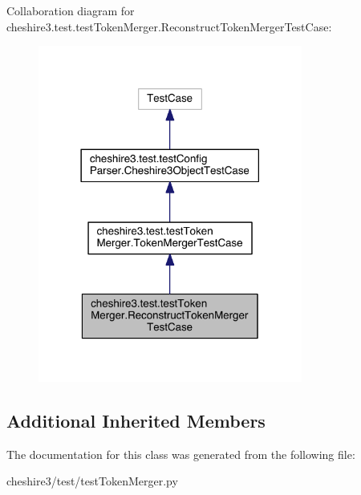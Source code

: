 Collaboration diagram for cheshire3.\-test.\-test\-Token\-Merger.\-Reconstruct\-Token\-Merger\-Test\-Case\-:
\nopagebreak
\begin{figure}[H]
\begin{center}
\leavevmode
\includegraphics[width=246pt]{classcheshire3_1_1test_1_1test_token_merger_1_1_reconstruct_token_merger_test_case__coll__graph}
\end{center}
\end{figure}
\subsection*{Additional Inherited Members}


The documentation for this class was generated from the following file\-:\begin{DoxyCompactItemize}
\item 
cheshire3/test/test\-Token\-Merger.\-py\end{DoxyCompactItemize}
